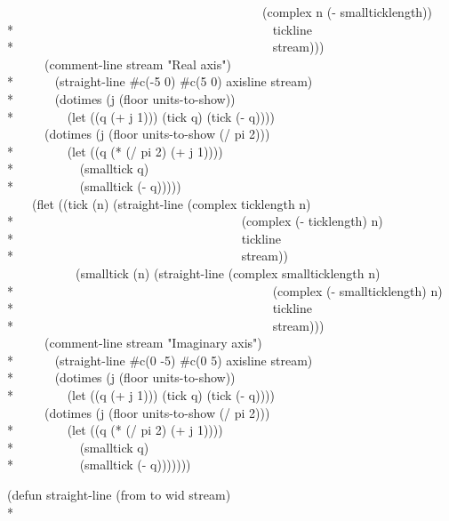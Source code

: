 \begin{new}
\begin{lisp}
~~~~~~~~~~~~~~~~~~~~~~~~~~~~~~~~~~~~~~~~~(complex n (- smallticklength)) \\*
~~~~~~~~~~~~~~~~~~~~~~~~~~~~~~~~~~~~~~~~~tickline \\*
~~~~~~~~~~~~~~~~~~~~~~~~~~~~~~~~~~~~~~~~~stream))) \\
~~~~~~(comment-line stream "Real axis") \\*
~~~~~~(straight-line \#c(-5 0) \#c(5 0) axisline stream) \\*
~~~~~~(dotimes (j (floor units-to-show)) \\*
~~~~~~~~(let ((q (+ j 1))) (tick q) (tick (- q)))) \\
~~~~~~(dotimes (j (floor units-to-show (/ pi 2))) \\*
~~~~~~~~(let ((q (* (/ pi 2) (+ j 1)))) \\*
~~~~~~~~~~(smalltick q) \\*
~~~~~~~~~~(smalltick (- q))))) \\
~~~~(flet ((tick (n) (straight-line (complex ticklength n) \\*
~~~~~~~~~~~~~~~~~~~~~~~~~~~~~~~~~~~~(complex (- ticklength) n) \\*
~~~~~~~~~~~~~~~~~~~~~~~~~~~~~~~~~~~~tickline \\*
~~~~~~~~~~~~~~~~~~~~~~~~~~~~~~~~~~~~stream)) \\
~~~~~~~~~~~(smalltick (n) (straight-line (complex smallticklength n) \\*
~~~~~~~~~~~~~~~~~~~~~~~~~~~~~~~~~~~~~~~~~(complex (- smallticklength) n) \\*
~~~~~~~~~~~~~~~~~~~~~~~~~~~~~~~~~~~~~~~~~tickline \\*
~~~~~~~~~~~~~~~~~~~~~~~~~~~~~~~~~~~~~~~~~stream))) \\
~~~~~~(comment-line stream "Imaginary axis") \\*
~~~~~~(straight-line \#c(0 -5) \#c(0 5) axisline stream) \\*
~~~~~~(dotimes (j (floor units-to-show)) \\*
~~~~~~~~(let ((q (+ j 1))) (tick q) (tick (- q)))) \\
~~~~~~(dotimes (j (floor units-to-show (/ pi 2))) \\*
~~~~~~~~(let ((q (* (/ pi 2) (+ j 1)))) \\*
~~~~~~~~~~(smalltick q) \\*
~~~~~~~~~~(smalltick (- q)))))))
\end{lisp}
 \newpage%
\begin{lisp}
(defun straight-line (from to wid stream) \\*

\end{lisp}
\end{new}
